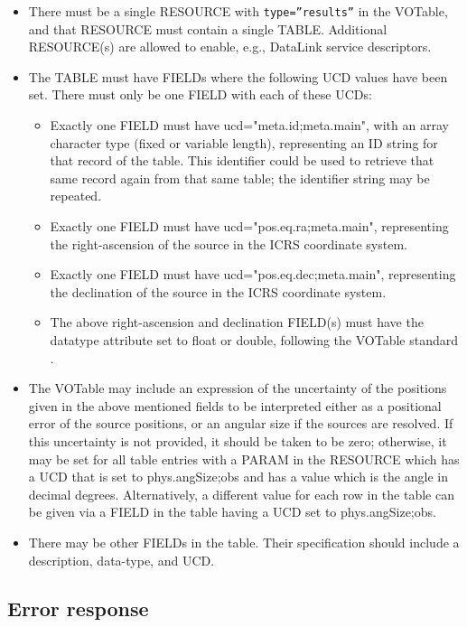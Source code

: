 \documentclass[11pt,a4paper]{ivoa}
\begin{document}
\begin{itemize}
	\item There must be a single RESOURCE with \texttt{type=''results''} in the VOTable,
		and that RESOURCE must contain a single TABLE. Additional RESOURCE(s) are
		allowed to enable, e.g., DataLink service descriptors.
	\item The TABLE must have FIELDs where
		the following UCD values have been set. There must only be one FIELD
		with each of these UCDs:

	\begin{itemize}
		\item Exactly one FIELD must have ucd="meta.id;meta.main",
	 		with an array character type (fixed or variable
			length), representing an ID string for that record of the table. This
			identifier could be used to retrieve that same record again from 
			that same table; the identifier string may be repeated.
		\item Exactly one FIELD must have ucd="pos.eq.ra;meta.main",
			representing the right-ascension of the source in the ICRS coordinate system.
		\item Exactly one FIELD must have ucd="pos.eq.dec;meta.main",
			representing the declination of the source in the ICRS coordinate system.
		\item The above right-ascension and declination FIELD(s) must have the datatype
			attribute set to float or double, following the VOTable
			standard \citep{2025ivoa.spec.0116O}.
	\end{itemize}

	\item The VOTable may include an expression of the
		uncertainty of the positions given in the above mentioned fields to be
		interpreted either as a positional error of the source positions, or an
		angular size if the sources are resolved. If this uncertainty is not
		provided, it should be taken to be zero; otherwise, it may be set for
		all table entries with a PARAM in the RESOURCE which has a UCD that is
		set to phys.angSize;obs and has a value which is the angle in decimal
		degrees. Alternatively, a different value for each row in the table can
		be given via a FIELD in the table having a UCD set to phys.angSize;obs.
	\item There may be other FIELDs in the table. Their specification should
		include a description, data-type, and UCD.
\end{itemize}
	
\subsection{Error response}
\label{subsec:error}
\end{document}
